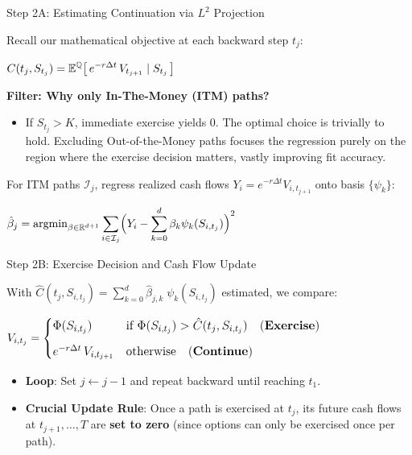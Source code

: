 \documentclass[10pt,aspectratio=169]{beamer}
\newcommand{\highlighteq}[1]{%
  \begin{center}
    \vspace{-0.1cm}
    \begin{tcolorbox}[
      colback=boxBg, colframe=mathGold, 
      boxrule=1.5pt, arc=2pt,
      top=4pt, bottom=4pt, left=4pt, right=4pt,
      width=0.95\linewidth, 
      halign=center, nobeforeafter
    ]
      $\displaystyle \fontsize{11}{14}\selectfont #1$
    \end{tcolorbox}
    \vspace{-0.1cm}
  \end{center}
}
\newcommand{\eqbox}[1]{%
  \begin{center}
    \vspace{-0.1cm}
    \begin{tcolorbox}[
      colback=white, colframe=mathBlue, 
      boxrule=1.0pt, arc=2pt,
      top=4pt, bottom=4pt, left=4pt, right=4pt,
      width=0.9\linewidth, 
      halign=center, nobeforeafter
    ]
      $\displaystyle \fontsize{10}{13}\selectfont #1$
    \end{tcolorbox}
    \vspace{-0.1cm}
  \end{center}
}
\newcommand{\R}{\mathbb{R}}
\newcommand{\Q}{\mathbb{Q}}
\newcommand{\E}{\mathbb{E}}
\newcommand{\argmin}{\operatorname{argmin}}
\begin{document}
\begin{frame}{Step 2A: Estimating Continuation via $L^2$ Projection}

Recall our mathematical objective at each backward step $t_j$:
\eqbox{
  C(t_j, S_{t_j}) = \E^\Q\bigl[\,e^{-r\Delta t}\,V_{t_{j+1}} \mid S_{t_j}\,\bigr]
}

\textbf{Filter: Why only In-The-Money (ITM) paths?}
\begin{itemize}
    \item If $S_{t_j} > K$, immediate exercise yields $0$. The optimal choice is trivially to hold. Excluding Out-of-the-Money paths focuses the regression purely on the region where the exercise decision matters, vastly improving fit accuracy.
\end{itemize}

\vspace{0.1cm}
For ITM paths $\mathcal{I}_j$, regress realized cash flows $Y_{i} = e^{-r\Delta t} V_{i,t_{j+1}}$ onto basis $\{\psi_k\}$:
\highlighteq{
  \hat{\beta}_j = \argmin_{\beta\in\R^{d+1}}
  \sum_{i\in\mathcal{I}_j} \Bigl(Y_{i} - \sum_{k=0}^{d} \beta_k \psi_k(S_{i,t_j})\Bigr)^2
}

\end{frame}

\begin{frame}{Step 2B: Exercise Decision and Cash Flow Update}

With $\hat{C}(t_j, S_{i,t_j}) = \sum_{k=0}^{d} \hat{\beta}_{j,k}\; \psi_k(S_{i,t_j})$ estimated, we compare:
\vspace{0.2cm}
\highlighteq{
  V_{i,t_j} =
  \begin{cases}
  \Phi(S_{i,t_j}) & \text{if } \Phi(S_{i,t_j}) > \hat{C}(t_j, S_{i,t_j}) \quad\text{(\textbf{Exercise})} \\[6pt]
  e^{-r\Delta t}\, V_{i,t_{j+1}} & \text{otherwise} \quad\text{(\textbf{Continue})}
  \end{cases}
}

\vspace{0.3cm}
\begin{itemize}
    \item \textbf{Loop}: Set $j \leftarrow j-1$ and repeat backward until reaching $t_1$.
    \item \textcolor{errorColor}{\textbf{Crucial Update Rule}}: Once a path is exercised at $t_j$, its future cash flows at $t_{j+1}, \dots, T$ are \textbf{set to zero} (since options can only be exercised once per path).
\end{itemize}
\end{frame}
\end{document}
